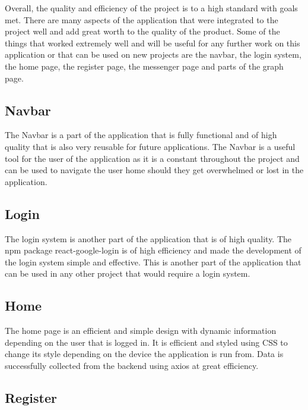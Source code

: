 Overall, the quality and efficiency of the project is to a high standard with goals met. There are many aspects of the application that were integrated to the project well and add great worth to the quality of the product. Some of the things that worked extremely well and will be useful for any further work on this application or that can be used on new projects are the navbar, the login system, the home page, the register page, the messenger page and parts of the graph page. \\

\subsection{Navbar}

The Navbar is a part of the application that is fully functional and of high quality that is also very reusable for future applications. The Navbar is a useful tool for the user of the application as it is a constant throughout the project and can be used to navigate the user home should they get overwhelmed or lost in the application. \\

\subsection{Login}

The login system is another part of the application that is of high quality. The npm package react-google-login is of high efficiency and made the development of the login system simple and effective. This is another part of the application that can be used in any other project that would require a login system. \\

\subsection{Home}

The home page is an efficient and simple design with dynamic information depending on the user that is logged in. It is efficient and styled using CSS to change its style depending on the device the application is run from. Data is successfully collected from the backend using axios at great efficiency. \\

\subsection{Register}

